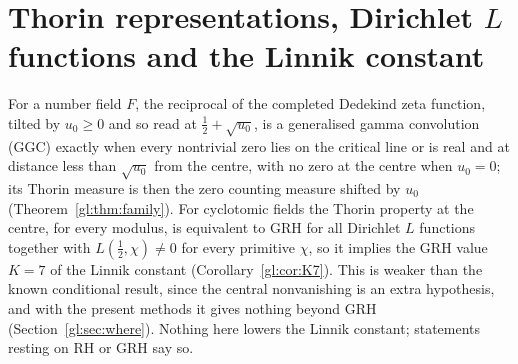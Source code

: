 \chapter{Thorin representations, Dirichlet \texorpdfstring{$L$}{L} functions and the Linnik constant}\label{chap:gl}

For a number field $F$, the reciprocal of the completed Dedekind zeta function, tilted by $u_0\ge0$ and so read at $\tfrac12+\sqrt{u_0}$, is a generalised gamma convolution (GGC) exactly when every nontrivial zero lies on the critical line or is real and at distance less than $\sqrt{u_0}$ from the centre, with no zero at the centre when $u_0=0$; its Thorin measure is then the zero counting measure shifted by $u_0$ (Theorem~\ref{gl:thm:family}). For cyclotomic fields the Thorin property at the centre, for every modulus, is equivalent to GRH for all Dirichlet $L$ functions together with $L(\tfrac12,\chi)\ne0$ for every primitive $\chi$, so it implies the GRH value $K=7$ of the Linnik constant (Corollary~\ref{gl:cor:K7}). This is weaker than the known conditional result, since the central nonvanishing is an extra hypothesis, and with the present methods it gives nothing beyond GRH (Section~\ref{gl:sec:where}). Nothing here lowers the Linnik constant; statements resting on RH or GRH say so.
